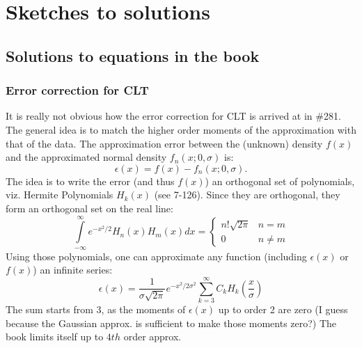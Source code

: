 \documentclass[a4paper]{book}
\begin{document}
\chapter*{Sketches to solutions}
\section{Solutions to equations in the book}

\subsection{Error correction for CLT}
\label{sec:error_correction}
It is really not obvious how the error correction for CLT is arrived at in \#281. The general idea is to match the higher order moments of the approximation with that of the data. The approximation error between the (unknown) density $f(x)$ and the approximated normal density $f_n(x; 0, \sigma)$ is:
%
\begin{equation}
\epsilon(x) = f(x)-f_n(x; 0, \sigma).
\end{equation}
%
The idea is to write the error (and thus $f(x)$) \ito an orthogonal set of polynomials, viz. Hermite Polynomials $H_k(x)$ (see 7-126). Since they are orthogonal, they form an orthogonal set on the real line:
%
\begin{equation}
\int\limits_{-\infty}^\infty e^{-x^2/2} H_n(x) H_m(x) dx = \begin{cases}n!\sqrt{2\pi}&n=m\\0&n\neq m\end{cases}
\label{eq:h_orth}
\end{equation}
%
Using those polynomials, one can approximate any function (including $\epsilon(x)$ or $f(x)$) \ito an infinite series:
%
\begin{equation}
\epsilon(x) = \frac{1}{\sigma \sqrt{2\pi}}e^{-x^2/2\sigma^2}\sum\limits_{k=3}^\infty C_k H_k\left(\frac{x}{\sigma}\right)
\end{equation}
%
The sum starts from $3$, as the moments of $\epsilon(x)$ up to order 2 are zero (I guess because the Gaussian approx. is sufficient to make those moments zero?) The book limits itself up to $4th$ order approx.
\end{document}
